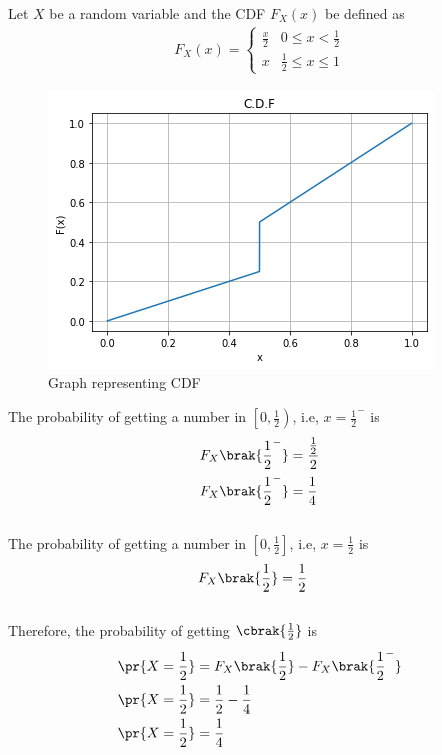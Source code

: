 Let $X$ be a random variable and the CDF $F_X(x)$ be defined as
\begin{align}
    F_X(x) =
\begin{cases}
    \frac{x}{2} & 0\leq x<\frac{1}{2} \\
    x & \frac{1}{2}\leq x\leq 1
\end{cases}
\end{align}
\begin{figure}[h]
    \centering
    \includegraphics[width=\columnwidth]{solutions/ec/72/Assignment_2_AI1103.png}
    \caption{Graph representing CDF}
    \label{ec72:fig:1}
\end{figure}
The probability of getting a number in $\left[0,\frac{1}{2}\right)$, i.e, $x=\frac{1}{2}^-$ is
\begin{align}
    F_X\brak{\frac{1}{2}^-} &= \frac{\frac{1}{2}}{2}\\
    F_X\brak{\frac{1}{2}^-} &= \frac{1}{4}
\end{align}\\
The probability of getting a number in $\left[0,\frac{1}{2}\right]$, i.e, $x=\frac{1}{2}$ is
\begin{align}
    F_X\brak{\frac{1}{2}} &= \frac{1}{2}
\end{align}\\
Therefore, the probability of getting $\cbrak{\frac{1}{2}}$ is
\begin{align}
    \pr{X=\frac{1}{2}} &= F_X\brak{\frac{1}{2}} - F_X\brak{\frac{1}{2}^-} \\
    \pr{X=\frac{1}{2}} &= \frac{1}{2} - \frac{1}{4} \\
    \pr{X=\frac{1}{2}} &= \frac{1}{4}
\end{align}

